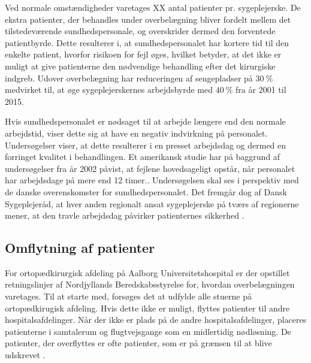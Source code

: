 \noindent 
Ved normale omstændigheder varetages XX antal patienter pr. sygeplejerske. De ekstra patienter, der behandles under overbelægning bliver fordelt mellem det tilstedeværende sundhedspersonale, og overskrider dermed den forventede patientbyrde. 
Dette resulterer i, at sundhedspersonalet har kortere tid til den enkelte patient, hvorfor risikoen for fejl øges, hvilket betyder, at det ikke er muligt at give patienterne den nødvendige behandling efter det kirurgiske indgreb. \cite{Dinges2004,Aiken2002} Udover overbelægning har reduceringen af sengepladser på $30~\%$ medvirket til, at øge sygeplejerskernes arbejdsbyrde med $40~\%$ fra år 2001 til 2015. \cite{Kjeldsen2015}


Hvis sundhedspersonalet er nødsaget til at arbejde længere end den normale arbejdstid, viser dette sig at have en negativ indvirkning på personalet.\cite{Kjeldsen2015,Dinges2004} Undersøgelser viser, at dette resulterer i en presset arbejdsdag og dermed en forringet kvalitet i behandlingen. \cite{Kjeldsen2015} Et amerikansk studie har på baggrund af undersøgelser fra år 2002 påvist, at fejlene hovedsageligt opstår, når personalet har arbejdsdage på mere end 12 timer.\cite{Dinges2004}. Undersøgelsen skal ses i perspektiv med de danske overenskomster for sundhedspersonalet. Det fremgår dog af Dansk Sygeplejeråd, at hver anden regionalt ansat sygeplejerske på tværs af regionerne mener, at den travle arbejdsdag påvirker patienternes sikkerhed \cite{Kjeldsen2015}. 
 
\subsection{Omflytning af patienter}
For ortopædkirurgisk afdeling på Aalborg Universitetshospital er der opstillet retningslinjer af Nordjyllands Beredskabsstyrelse for, hvordan overbelægningen varetages. Til at starte med, forsøges det at udfylde alle stuerne på ortopædkirugisk afdeling. Hvis dette ikke er muligt, flyttes patienter til andre hospitalsafdelinger. Når der ikke er plads på de andre hospitalsafdelinger, placeres patienterne i samtalerum og flugtvejsgange som en midlertidig nødløsning. \cite{Beredskab2016} De patienter, der overflyttes er ofte patienter, som er på grænsen til at blive udskrevet .
\noindent

